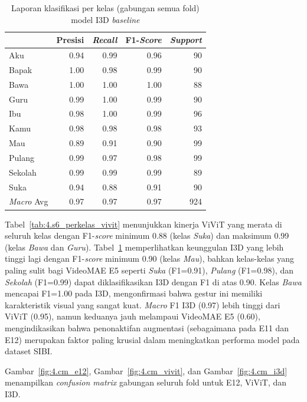 \begin{table}[H]
\centering
\caption{Laporan klasifikasi per kelas (gabungan semua fold) model I3D \textit{baseline}}
\label{tab:4.s6_perkelas_i3d}
\footnotesize
\begin{tabular}{|l|r|r|r|r|}
\hline
\rowcolor{gray!15} \multicolumn{1}{|c|}{Kelas} & \multicolumn{1}{c|}{Presisi} & \multicolumn{1}{c|}{\textit{Recall}} & \multicolumn{1}{c|}{F1-\textit{Score}} & \multicolumn{1}{c|}{\textit{Support}} \\
\hline
Aku     & 0.94 & 0.99 & 0.96 & 90 \\
Bapak   & 1.00 & 0.98 & 0.99 & 90 \\
Bawa    & 1.00 & 1.00 & 1.00 & 88 \\
Guru    & 0.99 & 1.00 & 0.99 & 90 \\
Ibu     & 0.98 & 1.00 & 0.99 & 96 \\
Kamu    & 0.98 & 0.98 & 0.98 & 93 \\
Mau     & 0.89 & 0.91 & 0.90 & 99 \\
Pulang  & 0.99 & 0.97 & 0.98 & 99 \\
Sekolah & 0.99 & 0.99 & 0.99 & 89 \\
Suka    & 0.94 & 0.88 & 0.91 & 90 \\
\hline
\textit{Macro} Avg & 0.97 & 0.97 & 0.97 & 924 \\
\hline
\end{tabular}
\end{table}

Tabel~\ref{tab:4.s6_perkelas_vivit} menunjukkan kinerja ViViT yang merata di seluruh kelas dengan F1-\textit{score} minimum 0.88 (kelas \textit{Suka}) dan maksimum 0.99 (kelas \textit{Bawa} dan \textit{Guru}). Tabel~\ref{tab:4.s6_perkelas_i3d} memperlihatkan keunggulan I3D yang lebih tinggi lagi dengan F1-\textit{score} minimum 0.90 (kelas \textit{Mau}), bahkan kelas-kelas yang paling sulit bagi VideoMAE E5 seperti \textit{Suka} (F1=0.91), \textit{Pulang} (F1=0.98), dan \textit{Sekolah} (F1=0.99) dapat diklasifikasikan I3D dengan F1 di atas 0.90. Kelas \textit{Bawa} mencapai F1=1.00 pada I3D, mengonfirmasi bahwa gestur ini memiliki karakteristik visual yang sangat kuat. \textit{Macro} F1 I3D (0.97) lebih tinggi dari ViViT (0.95), namun keduanya jauh melampaui VideoMAE E5 (0.60), mengindikasikan bahwa penonaktifan augmentasi (sebagaimana pada E11 dan E12) merupakan faktor paling krusial dalam meningkatkan performa model pada dataset SIBI.\par

Gambar~\ref{fig:4.cm_e12}, Gambar~\ref{fig:4.cm_vivit}, dan Gambar~\ref{fig:4.cm_i3d} menampilkan \textit{confusion matrix} gabungan seluruh fold untuk E12, ViViT, dan I3D.\par

